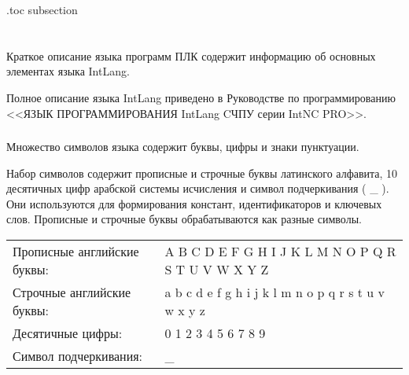 \etocsettocdepth.toc {subsection}

\chapter{}
\label{sec:DataTypes}

\renewcommand{\arraystretch}{1.2} %
\renewcommand{\tabcolsep}{0.2cm}   %
\section{}

Краткое описание языка программ ПЛК содержит информацию об основных элементах языка IntLang.

Полное описание языка IntLang приведено в Руководстве по программированию <<ЯЗЫК ПРОГРАММИРОВАНИЯ IntLang CЧПУ серии IntNC PRO>>.

\subsection{}

Множество символов языка содержит буквы, цифры и знаки пунктуации.\killoverfullbefore

Набор символов содержит прописные и строчные буквы латинского алфавита, 10 десятичных цифр арабской системы исчисления и символ подчеркивания ( \_ ). Они используются для формирования констант, идентификаторов и ключевых слов. Прописные и строчные буквы обрабатываются как разные символы. 

\renewcommand{\arraystretch}{1.4} %
\renewcommand{\tabcolsep}{0.5cm}   %
\begin{center}
\begin{tabular}{ l l }
Прописные английские буквы: & A B C D E F G H I J K L M N O P Q R S T U V W X Y Z \\
Строчные английские буквы: & a b c d e f g h i j k l m n o p q r s t u v w x y z  \\
Десятичные цифры: & 0 1 2 3 4 5 6 7 8 9  \\
Символ подчеркивания:  & \_ \\
\end{tabular}
\end{center}

